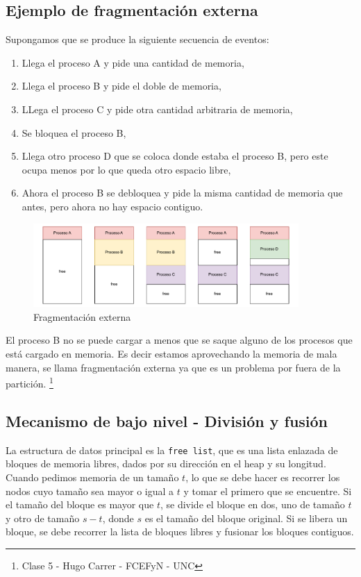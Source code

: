 \documentclass{article}
\begin{document}
\subsection{Ejemplo de fragmentación externa}
Supongamos que se produce la siguiente secuencia de eventos:
\begin{enumerate}
    \item Llega el proceso A y pide una cantidad de memoria,
    \item Llega el proceso B y pide el doble de memoria,
    \item LLega el proceso C y pide otra cantidad arbitraria de memoria,
    \item Se bloquea el proceso B,
    \item Llega otro proceso D que se coloca donde estaba el proceso B, pero este ocupa menos por lo que queda otro espacio libre,
    \item Ahora el proceso B se debloquea y pide la misma cantidad de memoria que antes, pero ahora no hay espacio contiguo.
\end{enumerate}

\begin{figure}[h]
    \centering
    \includegraphics[width=0.9\textwidth]{src/fragexterna.pdf}
    \caption{Fragmentación externa}
\end{figure}

El proceso B no se puede cargar a menos que se saque alguno de los procesos que está cargado en memoria. Es decir estamos aprovechando la memoria de mala manera, se llama fragmentación externa ya que es un problema por fuera de la partición. \footnote{Clase 5 - Hugo Carrer - FCEFyN - UNC}

\subsection{Mecanismo de bajo nivel - División y fusión}
La estructura de datos principal es la \texttt{free list}, que es una lista enlazada de bloques de memoria libres, dados por su dirección en el heap y su longitud. Cuando pedimos memoria de un tamaño $t$, lo que se debe hacer es recorrer los nodos cuyo tamaño sea mayor o igual a $t$ y tomar el primero que se encuentre. Si el tamaño del bloque es mayor que $t$, se divide el bloque en dos, uno de tamaño $t$ y otro de tamaño $s - t$, donde $s$ es el tamaño del bloque original. Si se libera un bloque, se debe recorrer la lista de bloques libres y fusionar los bloques contiguos. 
\end{document}

